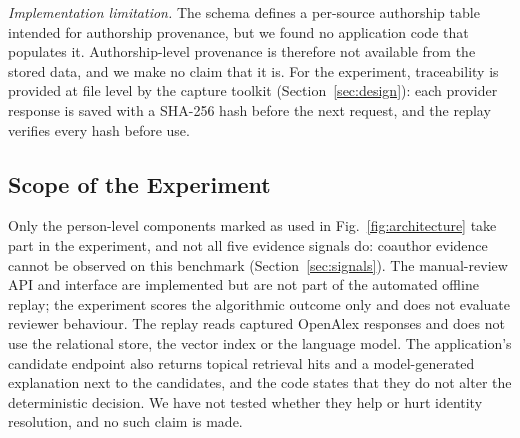 \emph{Implementation limitation.} The schema defines a per-source authorship table intended for authorship provenance, but we found no application code that populates it. Authorship-level provenance is therefore not available from the stored data, and we make no claim that it is. For the experiment, traceability is provided at file level by the capture toolkit (Section~\ref{sec:design}): each provider response is saved with a SHA-256 hash before the next request, and the replay verifies every hash before use.

\subsection{Scope of the Experiment}
Only the person-level components marked as used in Fig.~\ref{fig:architecture} take part in the experiment, and not all five evidence signals do: coauthor evidence cannot be observed on this benchmark (Section~\ref{sec:signals}). The manual-review API and interface are implemented but are not part of the automated offline replay; the experiment scores the algorithmic outcome only and does not evaluate reviewer behaviour. The replay reads captured OpenAlex responses and does not use the relational store, the vector index or the language model. The application's candidate endpoint also returns topical retrieval hits and a model-generated explanation next to the candidates, and the code states that they do not alter the deterministic decision. We have not tested whether they help or hurt identity resolution, and no such claim is made.
